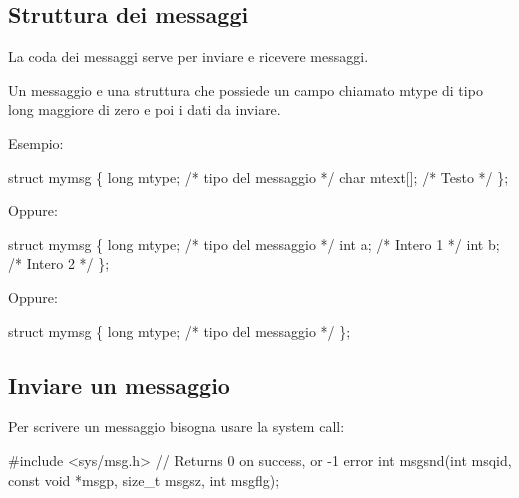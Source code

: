 \subsection*{Struttura dei messaggi}

La coda dei messaggi serve per inviare e ricevere messaggi.

Un messaggio e\textquotesingle{} una struttura che possiede un campo chiamato mtype di tipo long maggiore di zero e poi i dati da inviare.

Esempio\+: 
\begin{DoxyCode}
\textcolor{keyword}{struct }mymsg \{
    \textcolor{keywordtype}{long} mtype;   \textcolor{comment}{/* tipo del messaggio */}
    \textcolor{keywordtype}{char} mtext[]; \textcolor{comment}{/* Testo */}
\};
\end{DoxyCode}


Oppure\+: 
\begin{DoxyCode}
\textcolor{keyword}{struct }mymsg \{
    \textcolor{keywordtype}{long} mtype;   \textcolor{comment}{/* tipo del messaggio */}
    \textcolor{keywordtype}{int} a;        \textcolor{comment}{/* Intero 1 */}
    \textcolor{keywordtype}{int} b;        \textcolor{comment}{/* Intero 2 */}
\};
\end{DoxyCode}


Oppure\+: 
\begin{DoxyCode}
\textcolor{keyword}{struct }mymsg \{
    \textcolor{keywordtype}{long} mtype;   \textcolor{comment}{/* tipo del messaggio */}
\};
\end{DoxyCode}


\subsection*{Inviare un messaggio}

Per scrivere un messaggio bisogna usare la system call\+: 
\begin{DoxyCode}
\textcolor{preprocessor}{#include <sys/msg.h>}
\textcolor{comment}{// Returns 0 on success, or -1 error}
\textcolor{keywordtype}{int} msgsnd(\textcolor{keywordtype}{int} msqid, \textcolor{keyword}{const} \textcolor{keywordtype}{void} *msgp, \textcolor{keywordtype}{size\_t} msgsz, \textcolor{keywordtype}{int} msgflg);
\end{DoxyCode}


